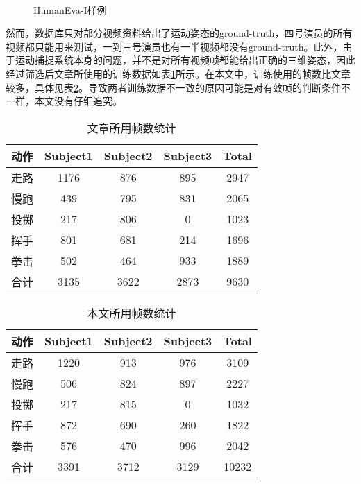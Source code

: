 \begin{figure}[htbp]
  \centering
  \hspace{.5cm}
  \\
  \hspace{.5cm}
  \caption{HumanEva-I样例}\label{fig:demo}
\end{figure}

然而，数据库只对部分视频资料给出了运动姿态的ground-truth，四号演员的所有视频都只能用来测试，一到三号演员也有一半视频都没有ground-truth。此外，由于运动捕捉系统本身的问题，并不是对所有视频帧都能给出正确的三维姿态，因此经过筛选后\cite{Poppe2007}\cite{bo2010twin}文章所使用的训练数据如表\ref{tab:poppe}所示。在本文中，训练使用的帧数比\cite{Poppe2007}\cite{bo2010twin}文章较多，具体见表\ref{tab:mydataset}。导致两者训练数据不一致的原因可能是对有效帧的判断条件不一样，本文没有仔细追究。

\begin{table}[htbp]
  \centering
  \caption{\cite{Poppe2007}\cite{bo2010twin}文章所用帧数统计}
  \label{tab:poppe}
    \begin{tabular}{lcccc}
      \toprule[1.5pt]
      动作 & Subject1 & Subject2 & Subject3 & Total \\\midrule[1pt]
      走路 & 1176 & 876 & 895 & 2947 \\
      慢跑 & 439 & 795 & 831 & 2065 \\
      投掷 & 217 & 806 & 0 & 1023\\
      挥手 & 801 & 681 & 214 & 1696\\
      拳击 & 502 & 464 & 933 & 1889\\
      合计 & 3135 & 3622 & 2873 & 9630\\
      \bottomrule[1.5pt]
    \end{tabular}
\end{table}

\begin{table}[htbp]
  \centering
  \caption{本文所用帧数统计}
  \label{tab:mydataset}
    \begin{tabular}{lcccc}
      \toprule[1.5pt]
      动作 & Subject1 & Subject2 & Subject3 & Total \\\midrule[1pt]
      走路 & 1220 & 913 & 976 & 3109 \\
      慢跑 & 506 & 824 & 897 & 2227 \\
      投掷 & 217 & 815 & 0 & 1032\\
      挥手 & 872 & 690 & 260 & 1822\\
      拳击 & 576 & 470 & 996 & 2042\\
      合计 & 3391 & 3712 & 3129 & 10232\\
      \bottomrule[1.5pt]
    \end{tabular}
\end{table}




